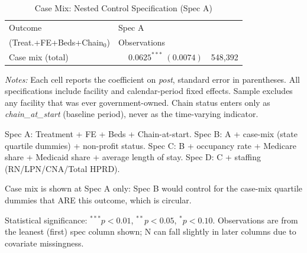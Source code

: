\begin{table}[H]
\centering
\begin{threeparttable}
\caption{Case Mix: Nested Control Specification (Spec A)}
\label{tab:nested-case-mix}
\small
\setlength{\tabcolsep}{6pt}
\begin{tabularx}{\textwidth}{@{} l Y r @{}}
\toprule
Outcome & Spec A\\(Treat.+FE+Beds+Chain$_{0}$) & Observations \\
\midrule
Case mix (total) &  & 548,392 \\
\bottomrule
\end{tabularx}

\begin{tablenotes}[flushleft]
\footnotesize
\item \textit{Notes:} Each cell reports the coefficient on \textit{post}, standard error in parentheses. All specifications include facility and calendar-period fixed effects. Sample excludes any facility that was ever government-owned. Chain status enters only as \textit{chain\_at\_start} (baseline period), never as the time-varying indicator.
\item Spec A: Treatment + FE + Beds + Chain-at-start. Spec B: A + case-mix (state quartile dummies) + non-profit status. Spec C: B + occupancy rate + Medicare share + Medicaid share + average length of stay. Spec D: C + staffing (RN/LPN/CNA/Total HPRD).
\item Case mix is shown at Spec A only: Spec B would control for the case-mix quartile dummies that ARE this outcome, which is circular.
\item Statistical significance: $^{***}p<0.01$, $^{**}p<0.05$, $^{*}p<0.10$. Observations are from the leanest (first) spec column shown; N can fall slightly in later columns due to covariate missingness.
\end{tablenotes}
\end{threeparttable}
\end{table}

